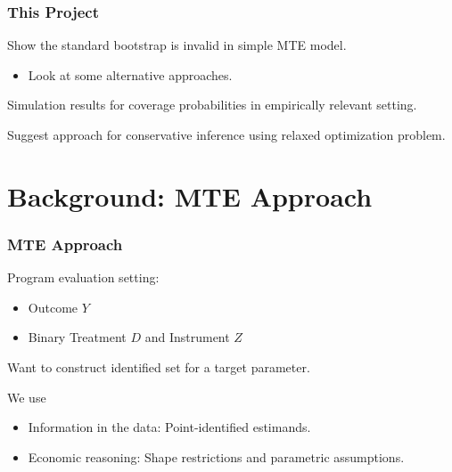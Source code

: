 \documentclass[11pt, aspectratio=169]{beamer}
\begin{document}
\begin{frame}
    \frametitle{This Project}

        Show the standard bootstrap is invalid in simple MTE model.
        \begin{itemize}
            \item Look at some alternative approaches.
        \end{itemize}

        \vspace{0.5cm}

        Simulation results for coverage probabilities in empirically relevant setting.

        \vspace{0.5cm}

        Suggest approach for conservative inference using relaxed optimization problem.

\end{frame}

\begin{frame}
    \tableofcontents
\end{frame}

\section{Background: MTE Approach}

\begin{frame}
    \frametitle{MTE Approach}

    Program evaluation setting:
    \begin{itemize}
        \item Outcome $Y$
        \item Binary Treatment $D$ and Instrument $Z$
    \end{itemize}

    \vspace{0.5cm}

    Want to construct identified set for a target parameter.

    \vspace{0.5cm}
    We use
    \begin{itemize}
        \item Information in the data: Point-identified estimands.
        \item Economic reasoning: Shape restrictions and parametric assumptions.
    \end{itemize}

\end{frame}
\end{document}

